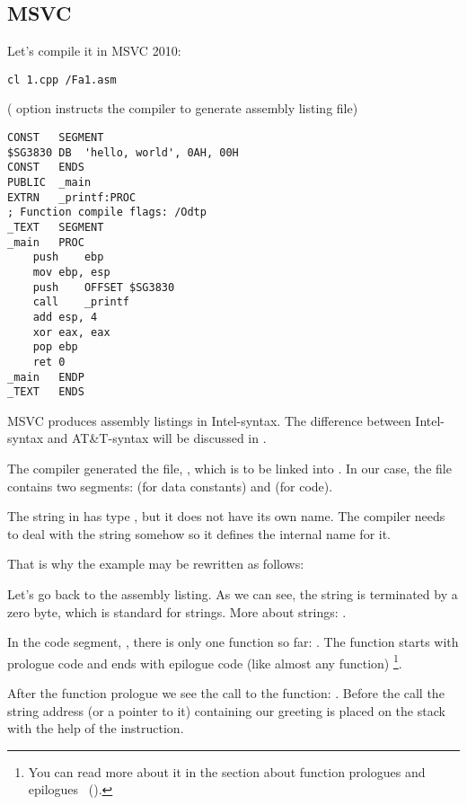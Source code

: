 \subsection{MSVC}

Let's compile it in MSVC 2010:

\begin{lstlisting}
cl 1.cpp /Fa1.asm
\end{lstlisting}

( option instructs the compiler to generate assembly listing file)

\begin{lstlisting}[caption=MSVC 2010]
CONST	SEGMENT
$SG3830	DB	'hello, world', 0AH, 00H
CONST	ENDS
PUBLIC	_main
EXTRN	_printf:PROC
; Function compile flags: /Odtp
_TEXT	SEGMENT
_main	PROC
	push	ebp
	mov	ebp, esp
	push	OFFSET $SG3830
	call	_printf
	add	esp, 4
	xor	eax, eax
	pop	ebp
	ret	0
_main	ENDP
_TEXT	ENDS
\end{lstlisting}

MSVC produces assembly listings in Intel-syntax.
The difference between Intel-syntax and AT\&T-syntax will be discussed in .

The compiler generated the file, , which is to be linked into .
In our case, the file contains two segments:  (for data constants) and  (for code).

\label{string_is_const_char}
The string  in \CCpp has type \cite[p176, 7.3.2]{TCPPPL}, but it does not have its own name.
The compiler needs to deal with the string somehow so it defines the internal name  for it.

That is why the example may be rewritten as follows:



Let's go back to the assembly listing. As we can see, the string is terminated by a zero byte, which is standard for \CCpp strings.
More about \CCpp strings: .

In the code segment, , there is only one function so far: \main{}.
The function \main starts with prologue code and ends with epilogue code (like almost any function)
\footnote{You can read more about it in the section about function prologues and epilogues ~().}.

After the function prologue we see the call to the \printf{} function: .
Before the call the string address (or a pointer to it) containing our greeting is placed on the stack with the help of the \PUSH instruction.

